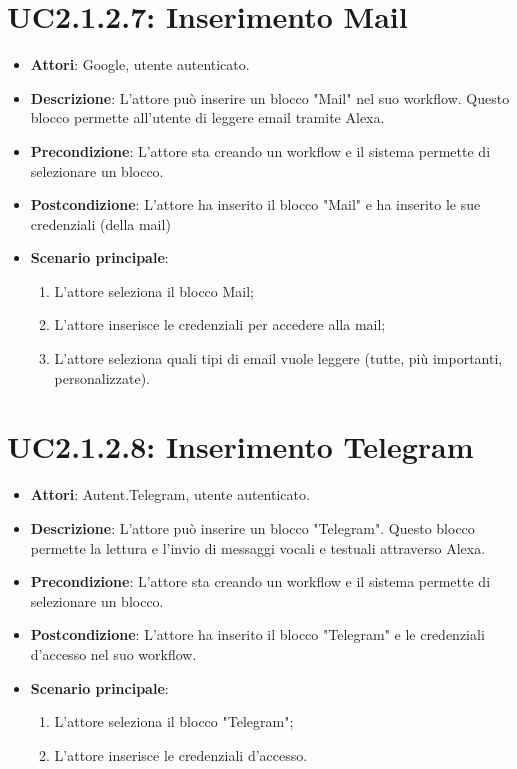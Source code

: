 \section{UC2.1.2.7: Inserimento Mail}
\label{UC2.1.2.7}
\begin{itemize}
	\item \textbf{Attori}: Google, utente autenticato.
	\item \textbf{Descrizione}: L'attore può inserire un blocco "Mail" nel suo workflow. Questo blocco permette all'utente di leggere email tramite Alexa.
	\item \textbf{Precondizione}: L'attore sta creando un workflow e il sistema permette di selezionare un blocco.
	\item \textbf{Postcondizione}: L'attore ha inserito il blocco "Mail" e ha inserito le sue credenziali (della mail)
	\item \textbf{Scenario principale}:
	\begin{enumerate} \item L'attore seleziona il blocco Mail;  \item  L'attore inserisce le credenziali per accedere alla mail;  \item  L'attore seleziona quali tipi di email vuole leggere (tutte, più importanti, personalizzate).\end{enumerate}
\end{itemize}

\section{UC2.1.2.8: Inserimento Telegram}
\label{UC2.1.2.8}
\begin{itemize}
	\item \textbf{Attori}: Autent.Telegram, utente autenticato.
	\item \textbf{Descrizione}: L'attore può inserire un blocco "Telegram". Questo blocco permette la lettura e l'invio di messaggi vocali e testuali attraverso Alexa.
	\item \textbf{Precondizione}: L'attore sta creando un workflow e il sistema permette di selezionare un blocco.
	\item \textbf{Postcondizione}: L'attore ha inserito il blocco "Telegram" e le credenziali d'accesso nel suo workflow.
	\item \textbf{Scenario principale}:
	\begin{enumerate} \item L'attore seleziona il blocco "Telegram";  \item  L'attore inserisce le credenziali d'accesso.\end{enumerate}
\end{itemize}

